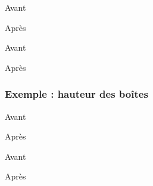 \begin{code}
\begin{fast}{Avant}
\end{fast}

\renewcommand*{\fastLargeurBoite}{1.5cm}	%
\begin{fast}{Après}
\end{fast}
\fastReset
\end{code}
\cqd
\begin{exemple}
\begin{fast}{Avant}
\end{fast}
\renewcommand*{\fastLargeurBoite}{1.5cm}
\begin{fast}{Après}
\end{fast}
\fastReset
\end{exemple}



		\subsubsection{Exemple : hauteur des boîtes}\label{hauteur}


\begin{code}
\begin{fast}{Avant}
\end{fast}
\renewcommand*{\fastHauteurBoite}{3em}
\begin{fast}{Après}
\end{fast}
\fastReset
\end{code}
\cqd
\begin{exemple}
\begin{fast}{Avant}
\end{fast}
\renewcommand*{\fastHauteurBoite}{3em}
\begin{fast}{Après}
\end{fast}
\fastReset
\end{exemple}


